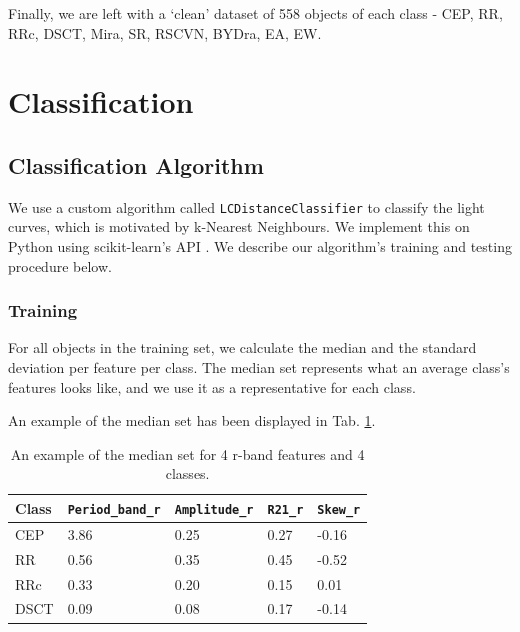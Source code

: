 \documentclass[conference]{IEEEtran}
\begin{document}
Finally, we are left with a `clean' dataset of 558 objects of each class - CEP, RR, RRc, DSCT, Mira, SR, RSCVN, BYDra, EA, EW.

\section{Classification} \label{sec:classification}

\subsection{Classification Algorithm} \label{subsec:classification_algorithm}
We use a custom algorithm called \texttt{LCDistanceClassifier} to classify the light curves, which is motivated by k-Nearest Neighbours. We implement this on Python using scikit-learn's API \cite{sklearn_api}. We describe our algorithm's training and testing procedure below.
\subsubsection{Training}
For all objects in the training set, we calculate the median and the standard deviation per feature per class. The median set represents what an average class's features looks like, and we use it as a representative for each class.

An example of the median set has been displayed in Tab. \ref{tab:median_set}.
\begin{table}[ht]
    \centering
        \begin{tabular}{|lllll|}
            \hline
            \textbf{Class} & \textbf{\texttt{Period\_band\_r}} & \textbf{\texttt{Amplitude\_r}} & \textbf{\texttt{R21\_r}} & \textbf{\texttt{Skew\_r}} \\ \hline
            CEP            & 3.86                 & 0.25              & 0.27        & -0.16        \\
            RR             & 0.56                 & 0.35              & 0.45        & -0.52        \\
            RRc            & 0.33                 & 0.20              & 0.15        & 0.01         \\
            DSCT           & 0.09                 & 0.08              & 0.17        & -0.14        \\ \hline
            \end{tabular}
\caption{An example of the median set for 4 r-band features and 4 classes.}
\label{tab:median_set}
\end{table}
\end{document}
